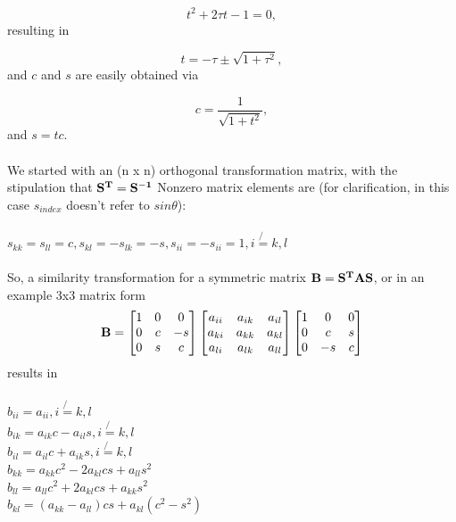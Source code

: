 \documentclass[%
reprint,
superscriptaddress,
showpacs,
nofootinbib,
bibnotes,amsmath,amssymb,aps,
prc, 
]{revtex4-1}
\begin{document}
	\begin{equation*}
		t^2+2\tau t-1= 0,
	\end{equation*}
	resulting in
	
	\begin{equation*}
		t = -\tau \pm \sqrt{1+\tau^2},
	\end{equation*}
	and $c$ and $s$ are easily obtained via
	
	\begin{equation*}
		c = \frac{1}{\sqrt{1+t^2}},
	\end{equation*}
	and $s=tc$.  
	\\ \\
	We started with an (n x n) orthogonal transformation matrix, with the stipulation that  
	$\bold{S^T}=\bold{S^{-1}}$
	Nonzero matrix elements are (for clarification, in this case $s_{index}$ doesn't refer to $sin\theta$):
	\\ \\
	$s_{kk}=s_{ll}=c,s_{kl}=-s_{lk}=-s,s_{ii}=-s_{ii}= 1,  i\not{=}k, l$
	\\ \\
	So, a similarity transformation for a symmetric matrix
	$\bold{B}=\bold{S^T}\bold{A}\bold{S}$, or in an example 3x3 matrix form
	\begin{equation*}
		\bold{B} = 
		\begin{bmatrix}1 & 0 & 0\\ 0 & c & -s \\ 0 & s & c \\\end{bmatrix} 
		\begin{bmatrix} a_{ii} & a_{ik} & a_{il} \\  a_{ki} & a_{kk} & a_{kl} \\ a_{li} & a_{lk} & a_{ll} \\ \end{bmatrix} 
		\begin{bmatrix} 1 & 0 & 0 \\ 0 & c & s \\0 & -s & c\\\end{bmatrix}
	\end{equation*}
	results in \\ \\
	$b_{ii}=a_{ii}, i\not{=}k, l$\\
	$b_{ik}=a_{ik}c-a_{il}s, i\not{=}k, l$\\
	$b_{il}=a_{il}c+a_{ik}s, i\not{=}k, l$\\
	$b_{kk}=a_{kk}c^{2}-2a_{kl}cs+a_{ll}s^{2}$\\
	$b_{ll}=a_{ll}c^{2}+2a_{kl}cs+a_{kk}s^{2}$\\
	$b_{kl}=(a_{kk}-a_{ll})cs+a_{kl}(c^{2}-s^{2})$ \\
	
\end{document}
